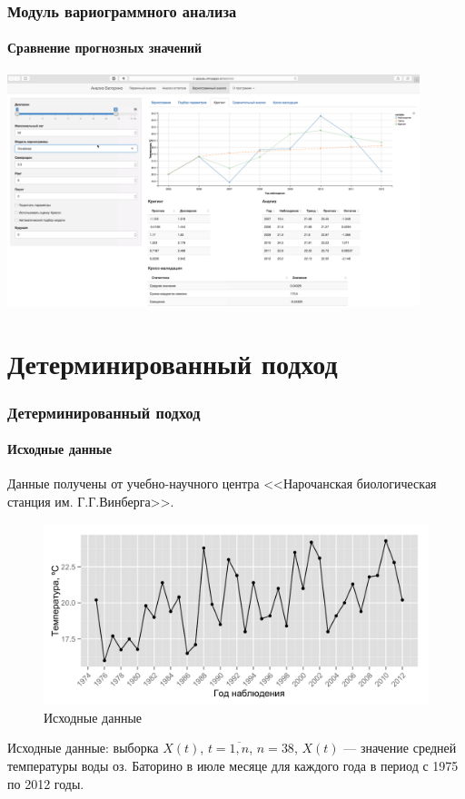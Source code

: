 \documentclass{beamer}
\begin{document}
\begin{frame}
  \frametitle{Модуль вариограммного анализа}
  \framesubtitle{Сравнение прогнозных значений}
  \begin{center}
    \includegraphics[width=0.9\textwidth]{../../figures/static/6_krige.png}
  \end{center}
\end{frame}

\section{Детерминированный подход}
\begin{frame}
  \frametitle{Детерминированный подход}
  \framesubtitle{Исходные данные}
  \begin{multicols}{2}
    Данные получены от учебно-научного центра <<Нарочанская биологическая станция им. Г.Г.Винберга>>.
    
    \columnbreak
    
    \begin{figure}[h]
      \includegraphics[width=\columnwidth]{../../figures/source.png}
      \caption{Исходные данные}
    \end{figure}
  \end{multicols}
  Исходные данные: выборка $ X(t) $, $ t = \overline{1,n} $, $ n = 38 $, $ X(t) $ --- значение средней температуры воды оз. Баторино в июле месяце для каждого года в период с 1975 по 2012 годы.
\end{frame}
\end{document}

